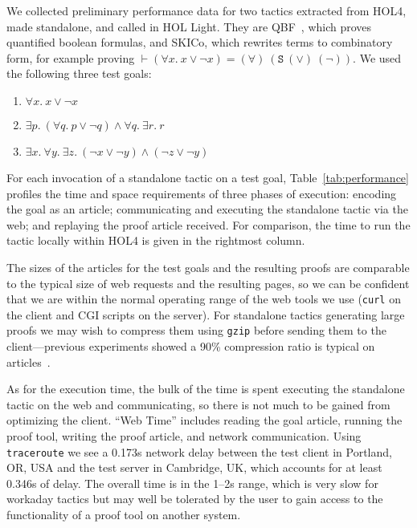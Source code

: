 \documentclass{llncs}
\begin{document}
We collected preliminary performance data for two tactics extracted from HOL4, made standalone, and called in HOL Light.
They are QBF~\cite{DBLP:conf/itp/KumarW11}, which proves quantified boolean formulas, and SKICo, which rewrites terms to combinatory form, for example proving $\vdash(\forall{x}.\ x\lor\lnot x)=(\forall)\ (\mathtt{S}\ (\lor)\ (\lnot))$.
We used the following three test goals:
\begin{enumerate}
\item $\forall x.\ x \lor\lnot x$

\item $\exists p.\ (\forall q.\ p \lor\lnot q) \land\forall q.\ \exists r.\ r$

\item $\exists x.\ \forall y.\ \exists z.\ (\lnot x \lor\lnot y) \land (\lnot z\lor\lnot y)$
\end{enumerate}
For each invocation of a standalone tactic on a test goal, Table~\ref{tab:performance} profiles the time and space requirements of three phases of execution: encoding the goal as an article; communicating and executing the standalone tactic via the web; and replaying the proof article received.
For comparison, the time to run the tactic locally within HOL4 is given in the rightmost column.

The sizes of the articles for the test goals and the resulting proofs are comparable to the typical size of web requests and the resulting pages, so we can be confident that we are within the normal operating range of the web tools we use (\texttt{curl} on the client and CGI scripts on the server). For standalone tactics generating large proofs we may wish to compress them using \texttt{gzip} before sending them to the client---previous experiments showed a 90\% compression ratio is typical on articles~\cite{hurd2009}.

As for the execution time, the bulk of the time is spent executing the standalone tactic on the web and communicating, so there is not much to be gained from optimizing the client.
``Web Time'' includes reading the goal article, running the proof tool, writing the proof article, and network communication.
Using \texttt{traceroute} we see a 0.173s network delay between the test client in Portland, OR, USA and the test server in Cambridge, UK, which accounts for at least 0.346s of delay.
The overall time is in the 1--2s range, which is very slow for workaday tactics but may well be tolerated by the user to gain access to the functionality of a proof tool on another system.
\end{document}
